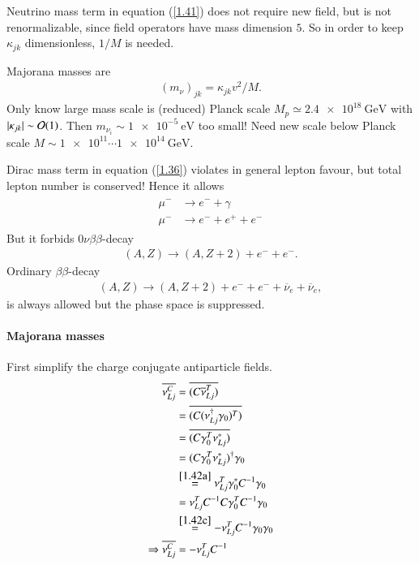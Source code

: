 Neutrino mass term in equation (\ref{1.41}) does not require new field, but is not renormalizable, since field operators have mass dimension $5$. So in order to keep $\kappa_{jk}$ dimensionless, $1/M$ is needed.

Majorana masses are
\begin{align}
   (m_\nu)_{jk} = \kappa_{jk} v^2 / M . \label{1.43}
\end{align}
Only know large mass scale is (reduced) Planck scale $M_p \simeq \SI{2.4e18}{\giga \eV}$ with $|\kappa_{jk}| \sim \order{1}$. Then $m_{\nu_i} \sim \SI{1e-5}{\eV}$ too small! Need new scale below Planck scale $M \sim \num{1e11} \cdots \SI{1e14}{\giga \eV}$.

Dirac mass term in equation (\ref{1.36}) violates in general lepton favour, but total lepton number is conserved! Hence it allows 
\begin{align}
   \begin{split}
      \mu^- &\rightarrow e^- + \gamma  \\
      \mu^- &\rightarrow e^- + e^+ + e^-
   \end{split} \label{1.44}
\end{align}
But it forbids $0\nu \beta \beta$-decay
\begin{align}
   (A,Z) \rightarrow (A,Z+2) + e^- + e^-. \label{1.45}
\end{align}
Ordinary $\beta\beta$-decay 
\begin{align}
   (A,Z) \rightarrow (A,Z+2) + e^- +e^- + \overline{\nu}_e+  \overline{\nu}_e,
\end{align}
is always allowed but the phase space is suppressed.

\paragraph{Majorana masses}
First simplify the charge conjugate antiparticle fields.
\begin{align}
    \overline{\nu^C_{Lj}} &= \overline{(C \overline{\nu}^T_{Lj})} \notag\\
                         &= \overline{ (C (\nu^\dagger_{Lj} \gamma_0)^T)} \notag\\
                         &= \overline{(C \gamma_0^T \nu_{Lj}^*)} \notag\\
                         &= (C \gamma_0^T \nu_{Lj}^*)^\dagger \gamma_0  \notag\\
                         &\stackrel{\ref{1.42a}}{=} \nu_{Lj}^T \gamma_0^* C^{-1}\gamma_0 \notag\\
                         &= \nu_{Lj}^T C^{-1} C \gamma_0^T C^{-1} \gamma_0 \notag\\
                         &\stackrel{\ref{1.42c}}{=} - \nu_{Lj}^T C^{-1} \gamma_0 \gamma_0 \notag\\ 
\Rightarrow    \overline{\nu^C_{Lj}}                     &= - \nu_{Lj}^T C^{-1} \label{1.46}
\end{align}

